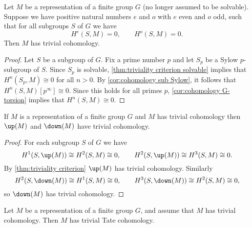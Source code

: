 \begin{theorem} \label{thm:triviality criterion}
	Let $M$ be a representation of a finite group $G$ (no longer assumed to be solvable).
	Suppose we have positive natural numbers $e$ and $o$ with $e$ even and $o$ odd, such that for all
	subgroups $S$ of $G$ we have
	\[
		H^e(S,M) =0, \qquad H^o(S,M) = 0.
	\]
	Then $M$ has trivial cohomology.
\end{theorem}

\begin{proof}
	Let $S$ be a subgroup of $G$.
	Fix a prime number $p$ and let $S_p$ be a Sylow $p$-subgroup of $S$.
	Since $S_p$ is solvable, \ref{thm:triviality criterion solvable} implies that
	$H^n(S_p,M) \cong 0$ for all $n > 0$.
	By \ref{cor:cohomology sub Sylow}, it follows that $H^n(S,M)[p^\infty] \cong 0$.
	Since this holds for all primes $p$,
	\ref{cor:cohomology G-torsion} implies that $H^n(S,M) \cong 0$.
\end{proof}

\begin{corollary}	\label{cor:up and down trivial cohomology}
	If $M$ is a representation of a finite group $G$ and $M$ has trivial cohomology
	then $\up(M)$ and $\down(M)$ have trivial cohomology.
\end{corollary}

\begin{proof}
	For each subgroup $S$ of $G$ we have
	\[
		H^1(S,\up(M)) \cong H^2(S,M) \cong 0,
		\qquad
		H^2(S,\up(M)) \cong H^3(S,M) \cong 0.
	\]
	By \ref{thm:triviality criterion} $\up(M)$ has trivial cohomology.
	Similarly
	\[
		H^2(S,\down(M)) \cong H^1(S,M) \cong 0,
		\qquad
		H^3(S,\down(M)) \cong H^2(S,M) \cong 0,
	\]
	so $\down(M)$ has trivial cohomology.
\end{proof}

\begin{theorem} \label{thm:trivial cohomology implies trivial Tate}
	Let $M$ be a representation of a finite group $G$, and assume that $M$ has trivial cohomology.
	Then $M$ has trivial Tate cohomology.
\end{theorem}

